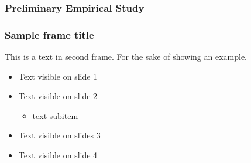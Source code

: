 \documentclass[13pt,aspectratio=169,t,xcolor=table]{beamer}
\begin{document}


\begin{frame}{}
    \frametitle{Preliminary Empirical Study}
\end{frame}



\begin{frame}
    \frametitle{Sample frame title}
    This is a text in second frame. For the sake of showing an example.
    
    \begin{itemize}
        \item<1-> Text visible on slide 1
        \item<2-> Text visible on slide 2
        \begin{itemize}
            \item text subitem
        \end{itemize}
        \item<3> Text visible on slides 3
        \item<4-> Text visible on slide 4
    \end{itemize}
\end{frame}

\titlepage
\end{document}
